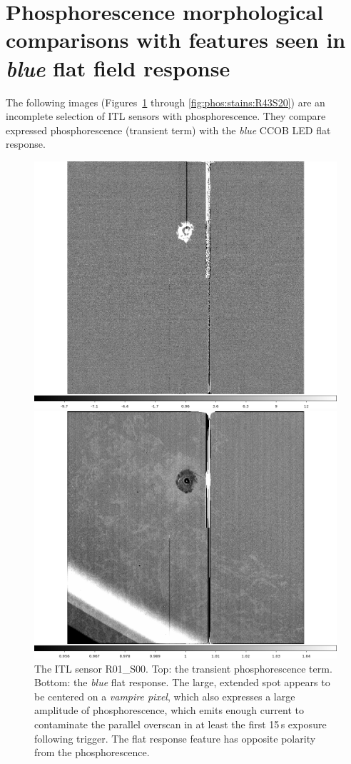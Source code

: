 \section{Phosphorescence morphological comparisons with features seen in {\it blue} flat field response}

The following images (Figures~\ref{fig:phos:stains:R01S00} through \ref{fig:phos:stains:R43S20}) are an incomplete selection of ITL sensors with phosphorescence. They compare expressed phosphorescence (transient term) with the {\it blue} CCOB LED flat response.

\begin{figure}[!htbp]
\centering
\begin{minipage}{1.0\textwidth}    
  \centering
  \includegraphics[width=.6\linewidth]{figures/phosphorescence-survey/stains_phos_R01_S00.png}    
\end{minipage}
\begin{minipage}{1.0\textwidth}
  \centering
  \includegraphics[width=.6\linewidth]{figures/phosphorescence-survey/stains_abs_R01_S00.png}
\end{minipage}
\caption{The ITL sensor R01\_S00. Top: the transient phosphorescence term. Bottom: the {\it blue} flat response. The large, extended spot appears to be centered on a {\it vampire pixel}, which also expresses a large amplitude of phosphorescence, which emits enough current to contaminate the parallel overscan in at least the first 15\,s exposure following trigger. The flat response feature has opposite polarity from the phosphorescence.}
\label{fig:phos:stains:R01S00}
\end{figure}


